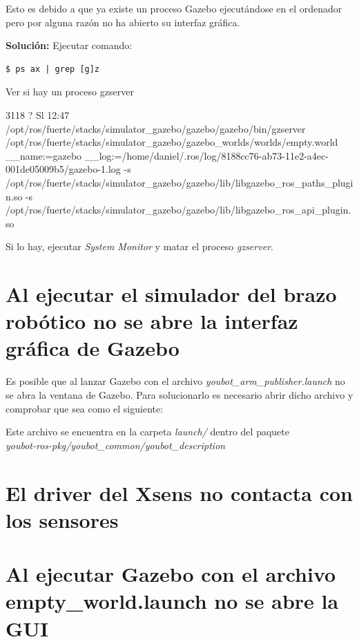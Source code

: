 \documentclass[12pt, a4paper]{report}
\begin{document}
Esto es debido a que ya existe un proceso Gazebo ejecutándose en el ordenador pero por alguna razón no ha abierto su interfaz gráfica.

\textbf{Solución: }
Ejecutar comando:
\begin{verbatim}
$ ps ax | grep [g]z
\end{verbatim}

Ver si hay un proceso gzserver

\footnotesize
\begin{spverbatim}
 3118 ?        Sl    12:47
 /opt/ros/fuerte/stacks/simulator_gazebo/gazebo/gazebo/bin/gzserver 
 /opt/ros/fuerte/stacks/simulator_gazebo/gazebo_worlds/worlds/empty.world __name:=gazebo __log:=/home/daniel/.ros/log/8188cc76-ab73-11e2-a4ec-001de05009b5/gazebo-1.log -s /opt/ros/fuerte/stacks/simulator_gazebo/gazebo/lib/libgazebo_ros_paths_plugin.so -s /opt/ros/fuerte/stacks/simulator_gazebo/gazebo/lib/libgazebo_ros_api_plugin.so

\end{spverbatim}
\normalsize

Si lo hay, ejecutar \textit{System Monitor} y matar el proceso \textit{gzserver}.

\section{Al ejecutar el simulador del brazo robótico no se abre la interfaz gráfica de Gazebo}

Es posible que al lanzar Gazebo con el archivo \textit{youbot\_arm\_publisher.launch} no se abra la ventana de Gazebo. Para solucionarlo es necesario abrir dicho archivo y comprobar que sea como el siguiente:



Este archivo se encuentra en la carpeta \textit{launch/} dentro del paquete\\ 
\textit{youbot-ros-pkg/youbot\_common/youbot\_description}

\section{El driver del Xsens no contacta con los sensores}

\section{Al ejecutar Gazebo con el archivo empty\_world.launch no se abre la GUI}
\end{document}
